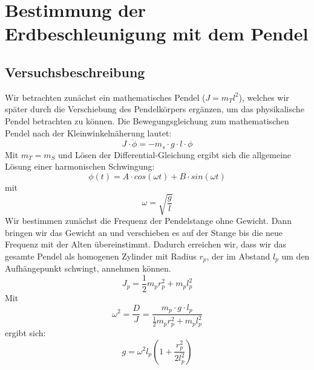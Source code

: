 \documentclass[12pt,a4paper]{article}
\author{Gruppe C14 \\ Julián Häck, Martin Koytek, Lars Wenning, Erik Zimmermann}
\begin{document}
\section{Bestimmung der Erdbeschleunigung mit dem Pendel}
\subsection{Versuchsbeschreibung}
Wir betrachten zunächst ein mathematisches Pendel ($J=m_Tl^2$), welches wir später durch die Verschiebung des Pendelkörpers ergänzen, um das physikalische Pendel betrachten zu können.
Die Bewegungsgleichung zum mathematischen Pendel nach der Kleinwinkelnäherung lautet:
\begin{equation}
J \cdot \ddot{\phi} = -m_s \cdot g \cdot l \cdot \phi 
\end{equation}
Mit $m_T=m_S$ und Lösen der Differential-Gleichung ergibt sich die allgemeine Lösung einer harmonischen Schwingung:
\begin{equation}
\phi(t)=A\cdot cos(\omega t) + B \cdot sin(\omega t)
\end{equation}
mit 
\begin{equation}
\omega=\sqrt{\frac{g}{l}}
\end{equation}
Wir bestimmen zunächst die Frequenz der Pendelstange ohne Gewicht. Dann bringen wir das Gewicht an und verschieben es auf der Stange bis die neue Frequenz mit der Alten übereinstimmt. Dadurch erreichen wir, dass wir das gesamte Pendel als homogenen Zylinder mit Radius $r_p$, der im Abstand $l_p$ um den Aufhängepunkt schwingt, annehmen können. 
\begin{equation}
J_p=\frac{1}{2}m_p r_p^2+m_p l_p^2
\end{equation}
Mit
\begin{equation}
\omega^2=\frac{D}{J}=\frac{m_p \cdot g \cdot l_p}{\frac{1}{2}m_p r_p^2+m_pl_p^2}
\end{equation}
ergibt sich:
\begin{equation}
g=\omega^2 l_p (1+\frac{r_p^2}{2 l_p^2}) 
\label{g}
\end{equation} 
\newpage
\end{document}

